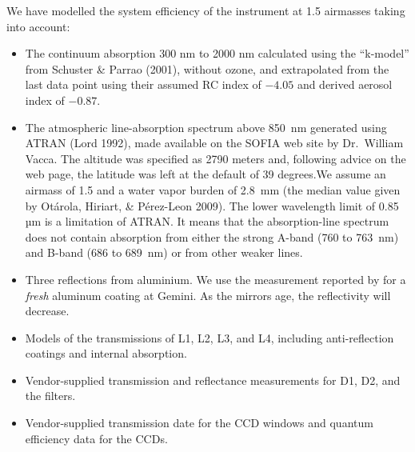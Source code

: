 We have modelled the system efficiency of the instrument at 1.5 airmasses taking into account:
\begin{itemize}
\item The continuum absorption 300 nm to 2000 nm calculated using the “k-model” from Schuster \& Parrao (2001), without ozone, and extrapolated from the last data point using their assumed RC index of $-4.05$ and derived aerosol index of $-0.87$. 

\item
The atmospheric line-absorption spectrum above 850~nm generated using ATRAN (Lord 1992), made available on the SOFIA web site by Dr.\ William Vacca. The altitude was specified as 2790 meters and, following advice on the web page, the latitude was left at the default of 39 degrees.We assume an airmass of 1.5 and a water vapor burden of 2.8~mm (the median value given by Otárola, Hiriart, \& Pérez-Leon 2009). The lower wavelength limit of 0.85 µm is a limitation of ATRAN. It means that the absorption-line spectrum does not contain absorption from either the strong A-band (760 to 763~nm) and B-band (686 to 689~nm) or from other weaker lines.

\item
Three reflections from aluminium. We use the measurement reported by \cite{Boccas-2006} for a \emph{fresh} aluminum coating at Gemini.  As the mirrors age, the reflectivity will decrease.

\item
Models of the transmissions of L1, L2, L3, and L4, including anti-reflection coatings and internal absorption.

\item
Vendor-supplied transmission and reflectance measurements for D1, D2, and the filters.

\item
Vendor-supplied transmission date for the CCD windows and quantum efficiency data for the CCDs.

\end{itemize}

